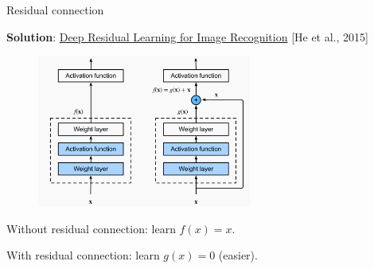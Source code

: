 \documentclass[usenames,dvipsnames,notes,11pt,aspectratio=169,hyperref={colorlinks=true, linkcolor=blue}]{beamer}
\begin{document}
\begin{frame}
    {Residual connection}

    \textbf{Solution}: \href{https://arxiv.org/pdf/1512.03385.pdf}{Deep Residual Learning for Image Recognition} [He et al., 2015]\\
    \begin{figure}
        \includegraphics[height=5cm]{figures/residual}
    \end{figure}

    Without residual connection: learn $f(x) = x$.

    With residual connection: learn $g(x)=0$ (easier).
\end{frame}
\end{document}
